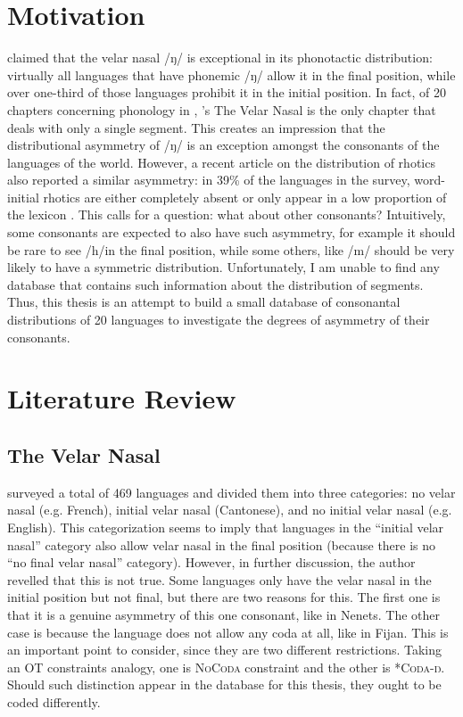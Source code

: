 \section{Motivation}

\citet{wals-9} claimed that the velar nasal  /ŋ/ is exceptional in its phonotactic distribution: virtually all languages that have phonemic /ŋ/ allow it in the final position, while over one-third of those languages prohibit it in the initial position. In fact, of 20 chapters concerning phonology in \citet{wals}, \citeauthor{wals-9}'s The Velar Nasal is the only chapter that deals with only a single segment. This creates an impression that the distributional asymmetry of /ŋ/ is an exception amongst the consonants of the languages of the world. However, a recent article on the distribution of rhotics also reported a similar asymmetry: in 39\% of the languages in the survey, word-initial rhotics are either completely absent or only appear in a low proportion of the lexicon \citep{labrune2021word}. This calls for a question: what about other consonants? Intuitively, some consonants are expected to also have such asymmetry, for example it should be rare to see /h/in the final position, while some others, like /m/ should be very likely to have a symmetric distribution. Unfortunately, I am unable to find any database that contains such information about the distribution of segments. Thus, this thesis is an attempt to build a small database of consonantal distributions of 20 languages to investigate the degrees of asymmetry of their consonants.

\section{Literature Review}

\subsection{The Velar Nasal}

\citet{wals-9} surveyed a total of 469 languages and divided them into three categories: no velar nasal (e.g. French), initial velar nasal (Cantonese), and no initial velar nasal (e.g. English). This categorization seems to imply that languages in the ``initial velar nasal'' category also allow velar nasal in the final position (because there is no ``no final velar nasal'' category). However, in further discussion, the author revelled that this is not true. Some languages only have the velar nasal in the initial position but not final, but there are two reasons for this. The first one is that it is a genuine asymmetry of this one consonant, like in Nenets. The other case is because the language does not allow any coda at all, like in Fijan. This is an important point to consider, since they are two different restrictions. Taking an OT constraints analogy, one is \textsc{NoCoda} constraint and the other is \textsc{*Coda-ŋ}. Should such distinction appear in the database for this thesis, they ought to be coded differently.

